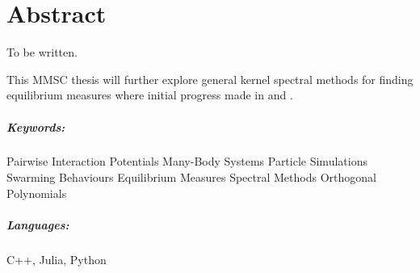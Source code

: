 \chapter*{Abstract}
\label{chap:abstract}
To be written.

This MMSC thesis will further explore general kernel spectral methods for finding equilibrium measures where initial progress made in \cite{2020-power-law-kernels} and \cite{2021-arbitrary-dimensions}.

\paragraph{Keywords:}
Pairwise Interaction Potentials
Many-Body Systems
Particle Simulations
Swarming Behaviours
Equilibrium Measures
Spectral Methods
Orthogonal Polynomials


\paragraph{Languages:}
C++, Julia, Python
